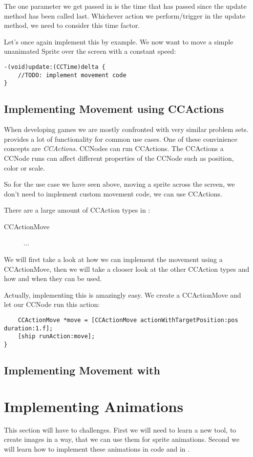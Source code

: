 The one parameter we get passed in is the time that has passed since the update
method has been called last. Whichever action we perform/trigger in the update
method, we need to consider this time factor.

Let's once again implement this by example. We now want to move a simple
unanimated Sprite over the screen with a constant speed:

\begin{lstlisting}
-(void)update:(CCTime)delta {
	//TODO: implement movement code
}
\end{lstlisting}

\subsection{Implementing Movement using CCActions}
When developing games we are mostly confronted with very similar problem sets.
\cocos{} provides a lot of functionality for common use cases. One of these
convinience concepts are \textit{CCActions}. CCNodes can run CCActions. The
CCActions a CCNode runs can affect different properties of the CCNode such as
position, color or scale.

So for the use case we have seen above, moving a sprite across the screen, we
don't need to implement custom movement code, we can use CCActions.

There are a large amount of CCAction types in \cocos{}:
\begin{description}
  \item[CCActionMove] ...
\end{description}

We will first take a look at how we can implement the movement using a
CCActionMove, then we will take a clooser look at the other CCAction types and
how and when they can be used.

Actually, implementing this is amazingly easy. We create a CCActionMove and let
our CCNode run this action:
\begin{lstlisting}
	CCActionMove *move = [CCActionMove actionWithTargetPosition:pos duration:1.f];
	[ship runAction:move];
}
\end{lstlisting}

\subsection{Implementing Movement with \spriteb{}}

\section{Implementing Animations}
This section will have to challenges. First we will need to learn a new tool, to
create images in a way, that we can use them for sprite animations. Second we
will learn how to implement these animations in code and in \spriteb{}.

